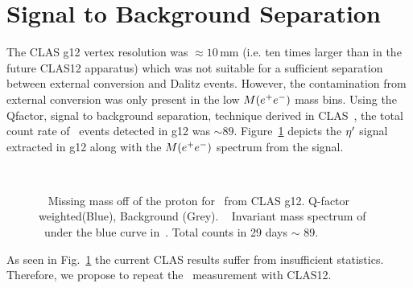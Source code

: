 \section{Signal to Background Separation}
The CLAS g12 vertex resolution was $\approx 10\,\mathrm{mm}$ (i.e. ten times larger than in the future CLAS12 apparatus) which was not suitable for a sufficient separation between external conversion and Dalitz events. However, the contamination from external conversion was only present in the low $M(e^+e^-)$ mass bins.
	Using the Qfactor, signal to background separation, technique derived in CLAS~\cite{qfactor}, the total count rate of \etaPDal \ events detected in g12 was $\sim 89$. Figure~\ref{fig:g12figs} depicts the $\eta^{\prime}$ signal extracted in g12 along with the $M(e^+e^-)$ spectrum from the signal. 
	\begin{figure}[h!]\begin{center}
			\\
			\caption[Counts rates for \etaTP from g12]{\label{fig:g12figs}~ Missing mass off of the proton for \etaPDal \  from CLAS g12. Q-factor weighted(Blue), Background (Grey). ~ Invariant mass spectrum of \epemT \ under the blue curve in~. Total counts in 29 days $\sim$ 89.}
		\end{center}\end{figure}
		\FloatBarrier 	
		As seen in Fig.~\ref{fig:g12figs} the current CLAS results suffer from insufficient statistics. Therefore, we propose to repeat the \etaPDal \  measurement with CLAS12.
		\FloatBarrier